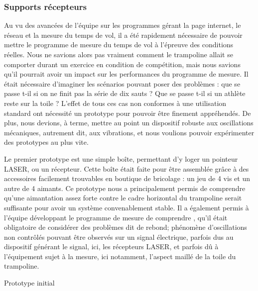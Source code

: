 \subsubsection{Supports récepteurs}
Au vu des avancées de l’équipe sur les programmes gérant la page internet, le réseau et la mesure du temps de vol, il a été rapidement nécessaire de pouvoir mettre le programme de mesure du temps de vol à l’épreuve des conditions réelles. Nous ne savions alors pas vraiment comment le trampoline allait se comporter durant un exercice en condition de compétition, mais nous savions qu’il pourrait avoir un impact sur les performances du programme de mesure. Il était nécessaire d’imaginer les scénarios pouvant poser des problèmes : que se passe t-il si on ne finit pas la série de dix sauts ? Que se passe t-il si un athlète reste sur la toile ? L’effet de tous ces cas non conformes à une utilisation standard ont nécessité un prototype pour pouvoir être finement appréhendés. De plus, nous devions, à terme, mettre au point un dispositif robuste aux oscillations mécaniques, autrement dit, aux vibrations, et nous voulions pouvoir expérimenter des prototypes au plus vite.

Le premier prototype est une simple boîte, permettant d’y loger un pointeur LASER, ou un récepteur. Cette boîte était faite pour être assemblée grâce à des accessoires facilement trouvables en boutique de bricolage : un jeu de 4 vis et un autre de 4 aimants. Ce prototype nous a principalement permis de comprendre qu’une aimantation assez forte contre le cadre horizontal du trampoline serait suffisante pour avoir un système convenablement stable. Il a également permis à l’équipe développant le programme de mesure de comprendre , qu’il était obligatoire de considérer des problèmes dit de rebond; phénomène d'oscillations non contrôlés pouvant être observés sur un signal électrique, parfois dus au dispositif générant le signal, ici, les récepteurs LASER, et parfois dû à l’équipement sujet à la mesure, ici notamment, l’aspect maillé de la toile du trampoline.

\begin{center}
  
  Prototype initial
\end{center}

